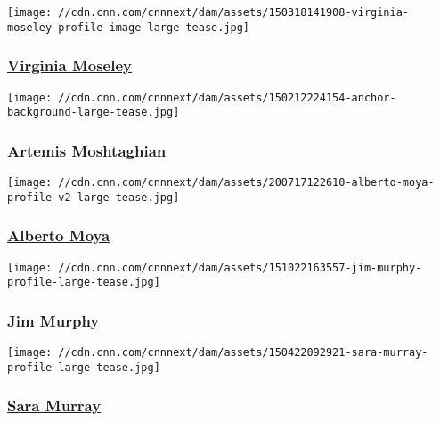 \href{/profiles/virginia-moseley-profile}{}

\texttt{[image: //cdn.cnn.com/cnnnext/dam/assets/150318141908-virginia-moseley-profile-image-large-tease.jpg]}

\hypertarget{virginia-moseley-}{%
\subsubsection{\texorpdfstring{\href{/profiles/virginia-moseley-profile}{Virginia
Moseley }}{Virginia Moseley }}\label{virginia-moseley-}}

\href{/profiles/artemis-moshtaghian}{}

\texttt{[image: //cdn.cnn.com/cnnnext/dam/assets/150212224154-anchor-background-large-tease.jpg]}

\hypertarget{artemis-moshtaghian}{%
\subsubsection{\texorpdfstring{\href{/profiles/artemis-moshtaghian}{Artemis
Moshtaghian}}{Artemis Moshtaghian}}\label{artemis-moshtaghian}}

\href{/profiles/alberto-moya-profile}{}

\texttt{[image: //cdn.cnn.com/cnnnext/dam/assets/200717122610-alberto-moya-profile-v2-large-tease.jpg]}

\hypertarget{alberto-moya}{%
\subsubsection{\texorpdfstring{\href{/profiles/alberto-moya-profile}{Alberto
Moya}}{Alberto Moya}}\label{alberto-moya}}

\href{/profiles/jim-murphy-profile}{}

\texttt{[image: //cdn.cnn.com/cnnnext/dam/assets/151022163557-jim-murphy-profile-large-tease.jpg]}

\hypertarget{jim-murphy}{%
\subsubsection{\texorpdfstring{\href{/profiles/jim-murphy-profile}{Jim
Murphy}}{Jim Murphy}}\label{jim-murphy}}

\href{/profiles/sara-murray}{}

\texttt{[image: //cdn.cnn.com/cnnnext/dam/assets/150422092921-sara-murray-profile-large-tease.jpg]}

\hypertarget{sara-murray-}{%
\subsubsection{\texorpdfstring{\href{/profiles/sara-murray}{Sara Murray
}}{Sara Murray }}\label{sara-murray-}}

